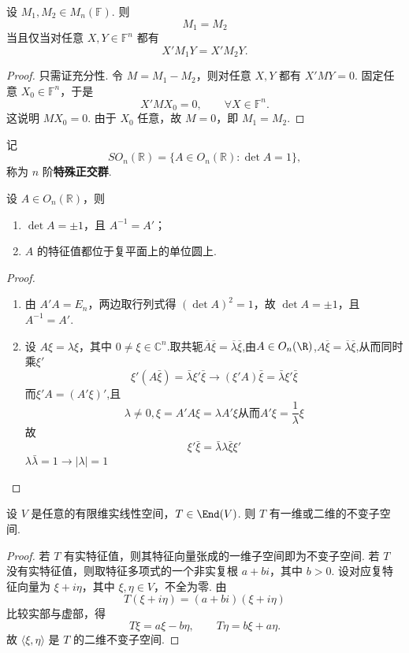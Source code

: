 \begin{lemma}
	设 $M_1,M_2\in M_n(\mathbb{F})$. 则
	\[
	M_1=M_2
	\]
	当且仅当对任意 $X,Y\in\mathbb{F}^n$ 都有
	\[
	X'M_1Y=X'M_2Y.
	\]
\end{lemma}
\begin{proof}
	只需证充分性. 令 $M=M_1-M_2$，则对任意 $X,Y$ 都有 $X'MY=0$. 固定任意 $X_0\in\mathbb{F}^n$，于是
	\[
	X'MX_0=0,
	\qquad \forall X\in\mathbb{F}^n.
	\]
	这说明 $MX_0=0$. 由于 $X_0$ 任意，故 $M=0$，即 $M_1=M_2$.
\end{proof}

\begin{definition}\label{p1:concept:c6-l1156}
	记
	\[
	SO_n(\mathbb{R})=\{A\in O_n(\mathbb{R}):\det A=1\},
	\]
	称为 $n$ 阶\textbf{特殊正交群}.
\end{definition}

\begin{lemma}
	设 $A\in O_n(\mathbb{R})$，则
	\begin{enumerate}
		\item $\det A=\pm1$，且 $A^{-1}=A'$；
		\item $A$ 的特征值都位于复平面上的单位圆上.
	\end{enumerate}
\end{lemma}
\begin{proof}
	\begin{enumerate}
		\item 由 $A'A=E_n$，两边取行列式得 $(\det A)^2=1$，故 $\det A=\pm1$，且 $A^{-1}=A'$.
		\item 设 $A\xi=\lambda\xi$，其中 $0\ne\xi\in\mathbb{C}^n$.取共轭$\overline{A} \overline{\xi}= \overline{\lambda}\overline{\xi}$,由$A\in O_n(\R)$,$A\overline{\xi}=\overline{\lambda}\overline{\xi}$,从而同时乘$\xi'$
		\[\xi'(A\bar{\xi}) = \bar{\lambda}\xi'\bar{\xi}\rightarrow (\xi'A)\bar{\xi} = \bar{\lambda}\xi'\bar{\xi}\]
		而$\xi'A = (A'\xi)'$,且
		\[\lambda \neq 0,\xi = A'A\xi = \lambda A'\xi \text{从而}A'\xi = \frac{1}{\lambda}\xi\]
		故\[\xi'\bar{\xi} =\bar{\lambda}\lambda\bar{\xi}\xi'\]
		$\lambda\bar{\lambda} =1 \rightarrow |\lambda|=1$
	\end{enumerate}
	

\end{proof}

\begin{lemma}
	设 $V$ 是任意的有限维实线性空间，$T\in\End(V)$. 则 $T$ 有一维或二维的不变子空间.
\end{lemma}
\begin{proof}
	若 $T$ 有实特征值，则其特征向量张成的一维子空间即为不变子空间.
	若 $T$ 没有实特征值，则取特征多项式的一个非实复根 $a+bi$，其中 $b>0$. 设对应复特征向量为 $\xi+i\eta$，其中 $\xi,\eta\in V$，不全为零. 由
	\[
	T(\xi+i\eta)=(a+bi)(\xi+i\eta)
	\]
	比较实部与虚部，得
	\[
	T\xi=a\xi-b\eta,
	\qquad
	T\eta=b\xi+a\eta.
	\]
	故 $\langle\xi,\eta\rangle$ 是 $T$ 的二维不变子空间.
\end{proof}

